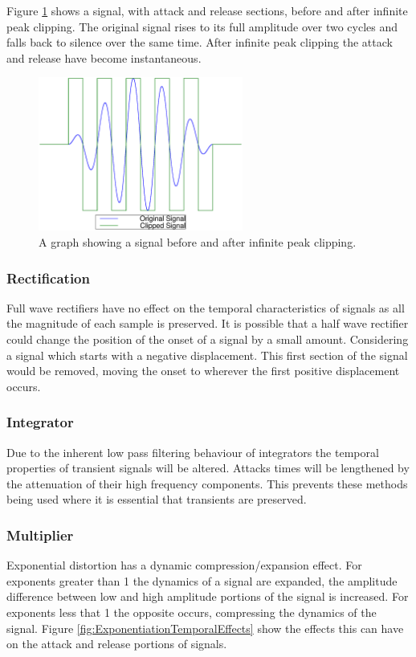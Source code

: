 			Figure \ref{fig:InfinitePeakClipping} shows a signal, with attack and release sections, before and
			after infinite peak clipping. The original signal rises to its full amplitude over two cycles and
			falls back to silence over the same time. After infinite peak clipping the attack and release have
			become instantaneous.

			\begin{figure}[h!]
				\centering
				\includegraphics[width=0.6\textwidth]{chapter5/Images/InfinitePeakClipping.eps}
				\caption{A graph showing a signal before and after infinite peak clipping.}
				\label{fig:InfinitePeakClipping}
			\end{figure}

		\subsubsection*{Rectification}
			Full wave rectifiers have no effect on the temporal characteristics of signals as all the magnitude
			of each sample is preserved. It is possible that a half wave rectifier could change the position of
			the onset of a signal by a small amount. Considering a signal which starts with a negative
			displacement. This first section of the signal would be removed, moving the onset to wherever the
			first positive displacement occurs.
			
		\subsubsection*{Integrator}
			Due to the inherent low pass filtering behaviour of integrators the temporal properties of
			transient signals will be altered. Attacks times will be lengthened by the attenuation of their
			high frequency components. This prevents these methods being used where it is essential that
			transients are preserved. 
			
		\subsubsection*{Multiplier}
			Exponential distortion has a dynamic compression/expansion effect. For exponents greater than 1 the
			dynamics of a signal are expanded, the amplitude difference between low and high amplitude portions
			of the signal is increased. For exponents less that 1 the opposite occurs, compressing the dynamics
			of the signal. Figure \ref{fig:ExponentiationTemporalEffects} show the effects this can have on the
			attack and release portions of signals.


